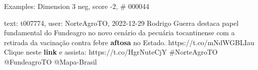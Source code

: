 \begin{frame}{Examples: Dimension 3 neg, score -2, \# 000044}
\footnotesize
\begin{alertblock}{text: t007774, user: NorteAgroTO, 2022-12-29}
 Rodrigo Guerra destaca papel fundamental do Fundeagro no novo 
cenário da pecuária tocantinense com a retirada da vacinação contra febre 
\textbf{aftosa} no Estado. https://t.co/mNdWGBLIau  Clique 
neste \textbf{link} e assista: https://t.co/HgrNuteCjY \#NorteAgroTO 
@FundeagroTO @Mapa-Brasil 
\end{alertblock}
\end{frame}
